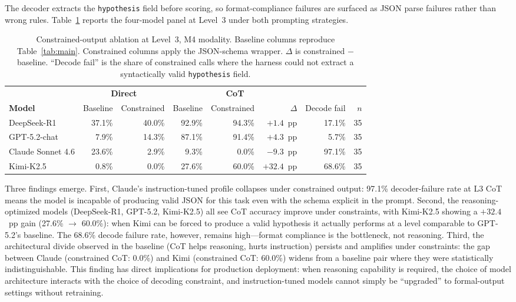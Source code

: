 \documentclass{article}
\theoremstyle{definition}
\begin{document}
The decoder extracts the \texttt{hypothesis} field before scoring, so format-compliance failures are surfaced as JSON parse failures rather than wrong rules. Table~\ref{tab:constrained} reports the four-model panel at Level~3 under both prompting strategies.

\begin{table}[h]
\centering
\caption{Constrained-output ablation at Level~3, M4 modality. Baseline columns reproduce Table~\ref{tab:main}. Constrained columns apply the JSON-schema wrapper. $\Delta$ is constrained $-$ baseline. ``Decode fail'' is the share of constrained calls where the harness could not extract a syntactically valid \texttt{hypothesis} field.}
\label{tab:constrained}
\small
\begin{tabular}{@{}lrrrrrrr@{}}
\toprule
& \multicolumn{2}{c}{\textbf{Direct}} & \multicolumn{3}{c}{\textbf{CoT}} & \multicolumn{2}{c}{} \\
\cmidrule(lr){2-3}\cmidrule(lr){4-6}
\textbf{Model} & Baseline & Constrained & Baseline & Constrained & $\Delta$ & Decode fail & $n$ \\
\midrule
DeepSeek-R1        & 37.1\% & 40.0\% & 92.9\% & 94.3\% & $+1.4$~pp & 17.1\% & 35 \\
GPT-5.2-chat       & \phantom{0}7.9\% & 14.3\% & 87.1\% & 91.4\% & $+4.3$~pp & \phantom{0}5.7\% & 35 \\
Claude Sonnet 4.6  & 23.6\% & \phantom{0}2.9\% & \phantom{0}9.3\% & \phantom{0}0.0\% & $-9.3$~pp & 97.1\% & 35 \\
Kimi-K2.5          & \phantom{0}0.8\% & \phantom{0}0.0\% & 27.6\% & 60.0\% & $\mathbf{+32.4}$~pp & 68.6\% & 35 \\
\bottomrule
\end{tabular}
\end{table}

Three findings emerge. First, Claude's instruction-tuned profile collapses under constrained output: 97.1\% decoder-failure rate at L3 CoT means the model is incapable of producing valid JSON for this task even with the schema explicit in the prompt. Second, the reasoning-optimized models (DeepSeek-R1, GPT-5.2, Kimi-K2.5) all see CoT accuracy improve under constraints, with Kimi-K2.5 showing a $+32.4$~pp gain (27.6\% $\to$ 60.0\%): when Kimi can be forced to produce a valid hypothesis it actually performs at a level comparable to GPT-5.2's baseline. The 68.6\% decode failure rate, however, remains high---format compliance is the bottleneck, not reasoning. Third, the architectural divide observed in the baseline (CoT helps reasoning, hurts instruction) persists and amplifies under constraints: the gap between Claude (constrained CoT: 0.0\%) and Kimi (constrained CoT: 60.0\%) widens from a baseline pair where they were statistically indistinguishable. This finding has direct implications for production deployment: when reasoning capability is required, the choice of model architecture interacts with the choice of decoding constraint, and instruction-tuned models cannot simply be ``upgraded'' to formal-output settings without retraining.
\end{document}
